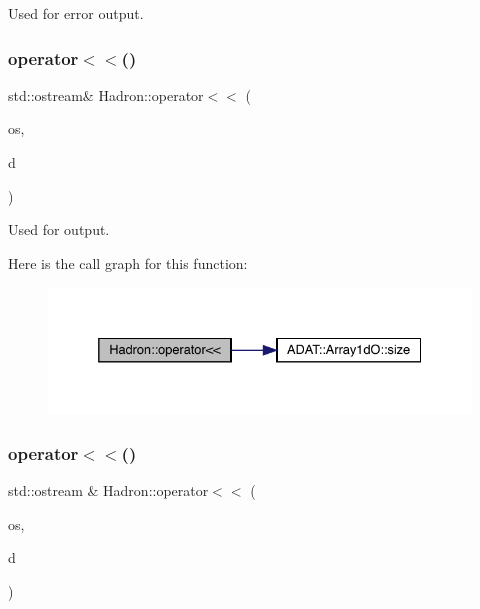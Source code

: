 Used for error output. 

\mbox{\label{namespaceHadron_ae9b46ddd0929bce6b0f65be81daed91a}} 
\subsubsection{\texorpdfstring{operator$<$$<$()}{operator<<()}\hspace{0.1cm}{\footnotesize\ttfamily [29/48]}}
{\footnotesize\ttfamily std\+::ostream\& Hadron\+::operator$<$$<$ (\begin{DoxyParamCaption}\item[{std\+::ostream \&}]{os,  }\item[{const \mbox{\hyperlink{classADAT_1_1Array1dO}{Array1dO}}$<$ \mbox{\hyperlink{structHadron_1_1KeyHadronSUNNPartIrrepOp__t_1_1CGPair__t}{Key\+Hadron\+S\+U\+N\+N\+Part\+Irrep\+Op\+\_\+t\+::\+C\+G\+Pair\+\_\+t}} $>$ \&}]{d }\end{DoxyParamCaption})}



Used for output. 

Here is the call graph for this function\+:
\nopagebreak
\begin{figure}[H]
\begin{center}
\leavevmode
\includegraphics[width=332pt]{d1/daf/namespaceHadron_ae9b46ddd0929bce6b0f65be81daed91a_cgraph}
\end{center}
\end{figure}
\mbox{\label{namespaceHadron_a6447e57d6b19af925c635187757e2f02}} 
\subsubsection{\texorpdfstring{operator$<$$<$()}{operator<<()}\hspace{0.1cm}{\footnotesize\ttfamily [30/48]}}
{\footnotesize\ttfamily std\+::ostream \& Hadron\+::operator$<$$<$ (\begin{DoxyParamCaption}\item[{std\+::ostream \&}]{os,  }\item[{const \mbox{\hyperlink{structHadron_1_1KeyHadronNPartNPtConnGraph__t}{Key\+Hadron\+N\+Part\+N\+Pt\+Conn\+Graph\+\_\+t}} \&}]{d }\end{DoxyParamCaption})}



